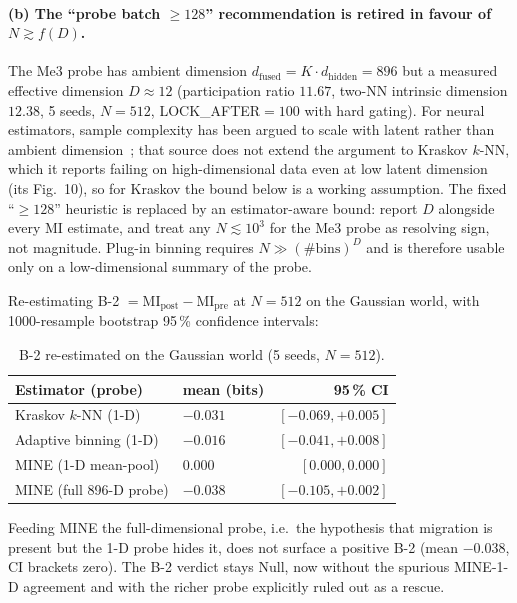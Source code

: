 \documentclass{article}
\begin{document}
\paragraph{(b) The ``probe batch $\geq 128$'' recommendation is
retired in favour of $N \gtrsim f(D)$.} The Me3 probe has ambient
dimension $d_{\mathrm{fused}} = K \cdot d_{\mathrm{hidden}} = 896$ but
a measured effective dimension $D \approx 12$ (participation ratio
$11.67$, two-NN intrinsic dimension $12.38$, 5 seeds, $N = 512$,
LOCK\_AFTER$=100$ with hard gating). For neural estimators, sample
complexity has been argued to scale with latent rather than ambient
dimension~\citep{abdelaleem2025accurate}; that source does not extend
the argument to Kraskov $k$-NN, which it reports failing on
high-dimensional data even at low latent dimension (its Fig.~10), so
for Kraskov the bound below is a working assumption. The fixed
``$\geq 128$'' heuristic is replaced by an estimator-aware bound:
report $D$ alongside every MI estimate, and treat any $N \lesssim
10^3$ for the Me3 probe as resolving sign, not magnitude. Plug-in
binning requires $N \gg (\#\mathrm{bins})^D$ and is therefore usable
only on a low-dimensional summary of the probe.

Re-estimating B-2 $= \mathrm{MI}_{\mathrm{post}} -
\mathrm{MI}_{\mathrm{pre}}$ at $N = 512$ on the Gaussian world, with
1000-resample bootstrap 95\,\% confidence intervals:

\begin{table}[ht]
  \centering
  \caption{B-2 re-estimated on the Gaussian world (5 seeds, $N=512$).}
  \label{tab:e1-gaussian}
  \begin{tabular}{llr}
    \toprule
    Estimator (probe) & mean (bits) & 95\,\% CI \\
    \midrule
    Kraskov $k$-NN (1-D)   & $-0.031$ & $[-0.069, +0.005]$ \\
    Adaptive binning (1-D) & $-0.016$ & $[-0.041, +0.008]$ \\
    MINE (1-D mean-pool)   & $0.000$  & $[0.000, 0.000]$ \\
    MINE (full 896-D probe) & $-0.038$ & $[-0.105, +0.002]$ \\
    \bottomrule
  \end{tabular}
\end{table}

Feeding MINE the full-dimensional probe, i.e.\ the hypothesis that
migration is present but the 1-D probe hides it, does not surface a
positive B-2 (mean $-0.038$, CI brackets zero). The B-2 verdict stays
Null, now without the spurious MINE-1-D agreement and with the richer
probe explicitly ruled out as a rescue.
\end{document}
